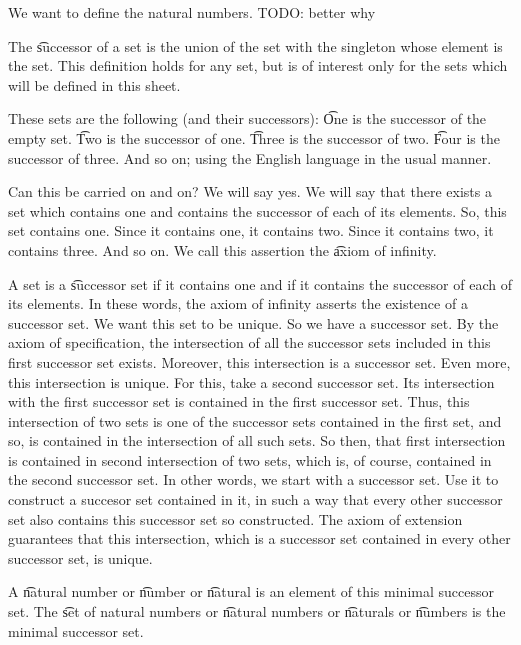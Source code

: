 

We want to define the natural numbers.
TODO: better why


The \t{successor} of a set is the union of the set with the singleton whose element is the set.
This definition holds for any set, but is of interest only for the sets which will be defined in this sheet.

These sets are the following (and their successors):
\t{One} is the successor of the empty set.
\t{Two} is the successor of one.
\t{Three} is the successor of two.
\t{Four} is the successor of three.
And so on; using the English language in the usual manner.

Can this be carried on and on?
We will say yes.
We will say that there exists a set which contains one and contains the successor of each of its elements.
So, this set contains one.
Since it contains one, it contains two.
Since it contains two, it contains three.
And so on.
We call this assertion the \t{axiom of infinity}.

A set is a \t{successor set} if it contains one and if it contains the successor of each of its elements.
In these words, the axiom of infinity asserts the existence of a successor set.
We want this set to be unique.
So we have a successor set.
By the axiom of specification, the intersection of all the successor sets included in this first successor set exists.
Moreover, this intersection is a successor set.
Even more, this intersection is unique.
For this, take a second successor set.
Its intersection with the first successor set is contained in the first successor set.
Thus, this intersection of two sets is one of the successor sets contained in the first set, and so, is contained in the intersection of all such sets.
So then, that first intersection is contained in second intersection of two sets, which is, of course, contained in the second successor set.
In other words, we start with a successor set.
Use it to construct a succesor set contained in it, in such a way that every other successor set also contains this successor set so constructed.
The axiom of extension guarantees that this intersection, which is a successor set contained in every other successor set, is unique.

A \t{natural number} or \t{number} or \t{natural} is an element of this minimal successor set.
The \t{set of natural numbers} or \t{natural numbers} or \t{naturals} or \t{numbers} is the minimal successor set.

